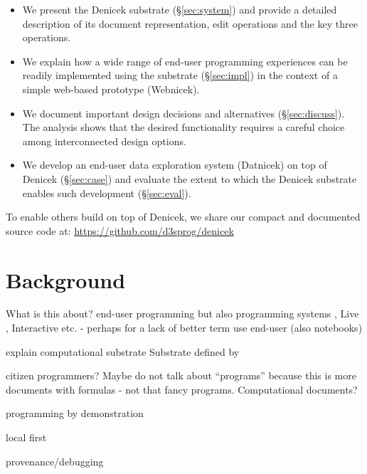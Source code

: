 \documentclass[sigconf,anonymous,screen]{acmart}
\begin{document}
\begin{itemize}
\item We present the Denicek substrate (\S\ref{sec:system}) and provide a detailed description of its
  document representation, edit operations and the key three operations.
\item We explain how a wide range of end-user programming experiences can be readily implemented using
  the substrate (\S\ref{sec:impl}) in the context of a simple web-based prototype (Webnicek).
\item We document important design decisions and alternatives (\S\ref{sec:discuss}). The analysis
  shows that the desired functionality requires a careful choice among interconnected design options.
\item We develop an end-user data exploration system (Datnicek) on top of Denicek (\S\ref{sec:case})
  and evaluate the extent to which the Denicek substrate enables such development (\S\ref{sec:eval}).
\end{itemize}

\noindent
To enable others build on top of Denicek, we share our compact and documented
source code at: \url{https://github.com/d3sprog/denicek}


\section{Background}
\label{sec:background}

What is this about? end-user programming \cite{myers-2006-eup}
but also programming systems \cite{jakubovic-2023-techdims},
Live \cite{rein-2019-live}, Interactive etc. - perhaps for a lack of better term use end-user
(also notebooks)

explain computational substrate
Substrate defined by \cite{jakubovic-2022-ladder}

citizen programmers? Maybe do not talk about ``programs'' because this is more documents with
formulas - not that fancy programs. Computational documents?



programming by demonstration
\cite{leiva-2021-rapido,cypher-1993-pbd}
\cite{chen-2023-miwa}

local first
\cite{kleppmann-2019-local,klokmose-2024-mywebstrates}

provenance/debugging
\cite{ko-2004-whyline,ko-2009-whyline,krebs-2023-probelog}
\cite{ricciotti-2017-imperative,perera-2012-functional}
\cite{perera-2022-linked}
\end{document}
